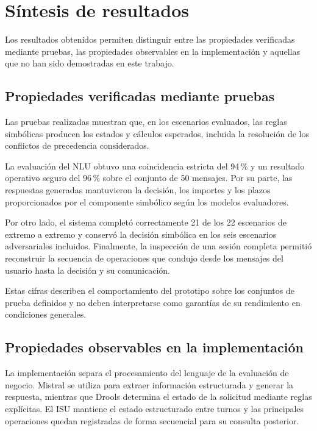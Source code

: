 \documentclass[12pt,a4paper]{report}
\begin{document}
\section{Síntesis de resultados} 

Los resultados obtenidos permiten distinguir entre las propiedades verificadas mediante pruebas, las propiedades observables en la implementación y aquellas que no han sido demostradas en este trabajo. 

\subsection{Propiedades verificadas mediante pruebas}

Las pruebas realizadas muestran que, en los escenarios evaluados, las reglas simbólicas producen los estados y cálculos esperados, incluida la resolución de los conflictos de precedencia considerados.

La evaluación del NLU obtuvo una coincidencia estricta del 94\,\% y un resultado operativo seguro del 96\,\% sobre el conjunto de 50 mensajes. Por su parte, las respuestas generadas mantuvieron la decisión, los importes y los plazos proporcionados por el componente simbólico según los modelos evaluadores.

Por otro lado, el sistema completó correctamente 21 de los 22 escenarios de extremo a extremo y conservó la decisión simbólica en los seis escenarios adversariales incluidos. Finalmente, la inspección de una sesión completa permitió reconstruir la secuencia de operaciones que condujo desde los mensajes del usuario hasta la decisión y su comunicación. 

Estas cifras describen el comportamiento del prototipo sobre los conjuntos de prueba definidos y no deben interpretarse como garantías de su rendimiento en condiciones generales.

\subsection{Propiedades observables en la implementación}

La implementación separa el procesamiento del lenguaje de la evaluación de negocio. Mistral se utiliza para extraer información estructurada y generar la respuesta, mientras que Drools determina el estado de la solicitud mediante reglas explícitas. El ISU mantiene el estado estructurado entre turnos y las principales operaciones quedan registradas de forma secuencial para su consulta posterior. 
\end{document}
